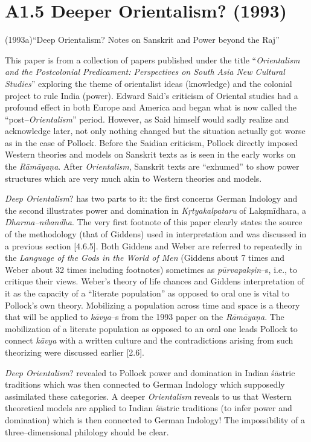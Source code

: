 \section*{A1.5 Deeper Orientalism? (1993)}

(1993a)“Deep Orientalism? Notes on Sanskrit and Power beyond the Raj”

This paper is from a collection of papers published under the title “\textit{Orientalism and the Postcolonial Predicament: Perspectives on South Asia New Cultural Studies}” exploring the theme of orientalist ideas (knowledge) and the colonial project to rule India (power). Edward Said’s criticism of Oriental studies had a profound effect in both Europe and America and began what is now called the “post–\textit{Orientalism}” period. However, as Said himself would sadly realize and acknowledge later, not only nothing changed but the situation actually got worse as in the case of Pollock. Before the Saidian criticism, Pollock directly imposed Western theories and models on Sanskrit texts as is seen in the early works on the \textit{Rāmāyaṇa}. After \textit{Orientalism}, Sanskrit texts are “exhumed” to show power structures which are very much akin to Western theories and models.

\textit{Deep Orientalism}? has two parts to it: the first concerns German Indology and the second illustrates power and domination in \textit{Kṛtyakalpataru} of Lakṣmīdhara, a \textit{Dharma–nibandha}. The very first footnote of this paper clearly states the source of the methodology (that of Giddens) used in interpretation and was discussed in a previous section [4.6.5]. Both Giddens and Weber are referred to repeatedly in the \textit{Language of the Gods in the World of Men }(Giddens about 7 times and Weber about 32 times including footnotes) sometimes as \textit{pūrvapakṣin}–s, i.e., to critique their views. Weber’s theory of life chances and Giddens interpretation of it as the capacity of a “literate population” as opposed to oral one is vital to Pollock’s own theory. Mobilizing a population across time and space is a theory that will be applied to \textit{kāvya}–s from the 1993 paper on the\textit{ Rāmāyaṇa}. The mobilization of a literate population as opposed to an oral one leads Pollock to connect \textit{kāvya} with a written culture and the contradictions arising from such theorizing were discussed earlier [2.6].

\textit{Deep Orientalism}? revealed to Pollock power and domination in Indian śāstric traditions which was then connected to German Indology which supposedly assimilated these categories. A deeper\textit{ Orientalism} reveals to us that Western theoretical models are applied to Indian śāstric traditions (to infer power and domination) which is then connected to German Indology! The impossibility of a three–dimensional philology should be clear.


